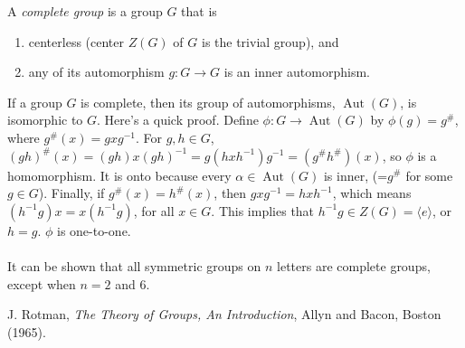\documentclass[12pt]{article}
\begin{document}
A \emph{complete group} is a group $G$ that is
\begin{enumerate}
\item centerless (center $Z(G)$ of $G$ is the trivial group), and
\item any of its automorphism $g\colon G\to G$ is an inner automorphism.
\end{enumerate}
If a group $G$ is complete, then its group of automorphisms,
$\operatorname{Aut}(G)$, is isomorphic to $G$.  Here's a quick
proof.  Define $\phi\colon G\to \operatorname{Aut}(G)$ by
$\phi(g)=g^{\#}$, where $g^{\#}(x)=gxg^{-1}$.  For $g,h\in G$,
$(gh)^{\#}(x)=(gh)x(gh)^{-1}=g(hxh^{-1})g^{-1}=(g^{\#}h^{\#})(x)$,
so $\phi$ is a homomorphism.  It is onto because every $\alpha\in
\operatorname{Aut}(G)$ is inner, (=$g^{\#}$ for some $g\in G$). Finally,
if $g^{\#}(x)=h^{\#}(x)$, then $gxg^{-1}=hxh^{-1}$, which means
$(h^{-1}g)x=x(h^{-1}g)$, for all $x\in G$.  This implies that
$h^{-1}g\in Z(G)=\langle e \rangle$, or $h=g$.  $\phi$ is
one-to-one.
\\\\
It can be shown that all symmetric groups on $n$ letters are
complete groups, except when $n=2$ and $6$.

\begin{thebibliography}{8}
 J. Rotman, {\em The Theory of Groups, An Introduction},
Allyn and Bacon, Boston (1965).
\end{thebibliography}
\end{document}

